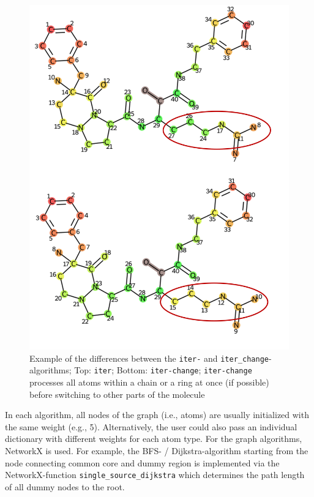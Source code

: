 \begin{figure}
\includegraphics[scale=0.25]{iter_iter_change_1a5g_1_two_rows}
\caption{Example of the differences between the \texttt{iter-} and \texttt{iter\_change}-algorithms;
Top: \texttt{iter}; Bottom: \texttt{iter-change}; \texttt{iter-change }processes all atoms within
a chain or a ring at once (if possible) before switching to other
parts of the molecule}
\label{fig:iter_iter_change_comparison}
\end{figure}

In each algorithm, all nodes of the graph (i.e., atoms) are usually
initialized with the same weight (e.g., 5). Alternatively, the user
could also pass an individual dictionary with different weights for
each atom type.
For the graph algorithms, NetworkX is used. For example,
the BFS- / Dijkstra-algorithm starting from the node connecting common
core and dummy region is implemented via the NetworkX-function \texttt{single\_source\_dijkstra}
which determines the path length of all dummy nodes to the root.

